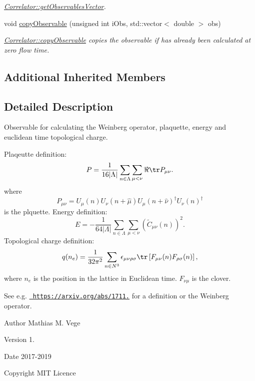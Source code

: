 \begin{DoxyCompactItemize}
\begin{DoxyCompactList}\small\item\em \mbox{\hyperlink{class_correlator_a7fb062b098beb078f3e546f4717b4941}{Correlator\+::get\+Observables\+Vector}}. \end{DoxyCompactList}\item 
void \mbox{\hyperlink{class_super_sampler_a9f9155a519b2f60f029e92f641f54c9c}{copy\+Observable}} (unsigned int i\+Obs, std\+::vector$<$ double $>$ obs)
\begin{DoxyCompactList}\small\item\em \mbox{\hyperlink{class_correlator_ac780d8b180294ee4801ede6e6a13f7f4}{Correlator\+::copy\+Observable}} copies the observable if has already been calculated at zero flow time. \end{DoxyCompactList}\end{DoxyCompactItemize}
\subsection*{Additional Inherited Members}


\subsection{Detailed Description}
Observable for calculating the Weinberg operator, plaquette, energy and euclidean time topological charge. 

Plaqeutte definition\+: \[ P = \frac{1}{16|\Lambda|} \sum_{n\in\Lambda} \sum_{\mu < \nu} \Re \tr P_{\mu\nu}. \] where \[ P_{\mu\nu}=U_\mu(n) U_{\nu}(n+\hat{\mu}) U_{\mu}(n+\hat{\nu})^\dagger U_{\nu} (n)^\dagger \] is the plquette. Energy definition\+: \[ E = -\frac{1}{64|\Lambda|} \sum_{n\in\Lambda} \sum_{\mu<\nu} \left(\tilde{C}_{\mu\nu}(n)\right)^2. \] Topological charge definition\+: \[ q(n_e) = \frac{1}{32\pi^2} \sum_{n\in N^3} \epsilon_{\mu\nu\rho\sigma} \tr\left[F_{\mu\nu}(n)F_{\rho\sigma}(n)\right], \] where $n_e$ is the position in the lattice in Euclidean time. $F_{\nu\mu}$ is the clover.

See e.\+g. \href{https://arxiv.org/abs/1711.04730}{\texttt{ https\+://arxiv.\+org/abs/1711.}} for a definition or the Weinberg operator.

\begin{DoxyAuthor}{Author}
Mathias M. Vege 
\end{DoxyAuthor}
\begin{DoxyVersion}{Version}
1. 
\end{DoxyVersion}
\begin{DoxyDate}{Date}
2017-\/2019 
\end{DoxyDate}
\begin{DoxyCopyright}{Copyright}
M\+IT Licence 
\end{DoxyCopyright}


